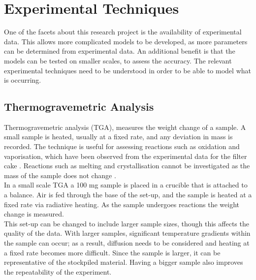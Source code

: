 \section{Experimental Techniques}
One of the facets about this research project is the availability of experimental data. This allows more complicated models to be developed, as more parameters can be determined from experimental data. An additional benefit is that the models can be tested on smaller scales, to assess the accuracy. The relevant experimental techniques need to be understood in order to be able to model what is occurring.

\subsection{Thermogravemetric Analysis}
\label{Kis}
Thermogravemetric analysis (TGA), measures the weight change of a sample. A small sample is heated, usually at a fixed rate, and any deviation in mass is recorded. The technique is useful for assessing reactions such as oxidation and vaporisation, which have been observed from the experimental data for the filter cake \cite{Ray19}. Reactions such as melting and crystallisation cannot be investigated as the mass of the sample does not change \cite{thermal}.\\
In a small scale TGA a 100 mg sample is placed in a crucible that is attached to a balance. Air is fed through the base of the set-up, and the sample is heated at a fixed rate via radiative heating. As the sample undergoes reactions the weight change is measured.\\
This set-up can be changed to include larger sample sizes, though this affects the quality of the data. With larger samples, significant temperature gradients within the sample can occur; as a result, diffusion needs to be considered and heating at a fixed rate becomes more difficult. Since the sample is larger, it can be representative of the stockpiled material. Having a bigger sample also improves the repeatability of the experiment.\\

